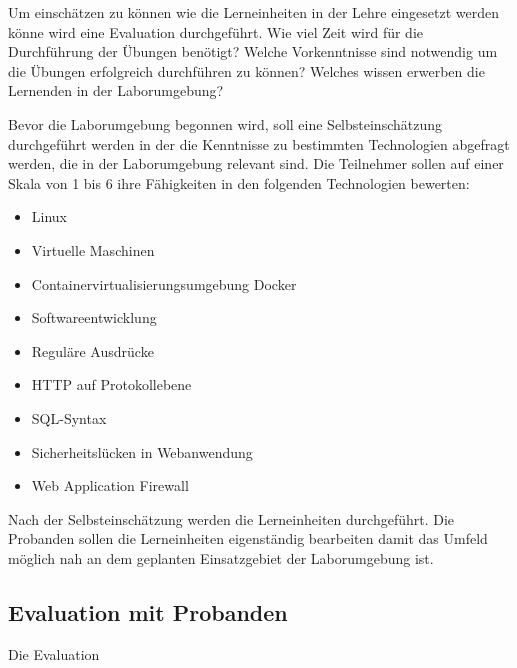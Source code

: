 Um einschätzen zu können wie die Lerneinheiten in der Lehre eingesetzt werden könne wird eine Evaluation durchgeführt.
Wie viel Zeit wird für die Durchführung der Übungen benötigt?
Welche Vorkenntnisse sind notwendig um die Übungen erfolgreich durchführen zu können?
Welches wissen erwerben die Lernenden in der Laborumgebung?

Bevor die Laborumgebung begonnen wird, soll eine Selbsteinschätzung durchgeführt werden in der die Kenntnisse zu bestimmten Technologien abgefragt werden, die in der Laborumgebung relevant sind.
Die Teilnehmer sollen auf einer Skala von 1 bis 6 ihre Fähigkeiten in den folgenden Technologien bewerten:

\begin{itemize}
    \item Linux
    \item Virtuelle Maschinen
    \item Containervirtualisierungsumgebung Docker
    \item Softwareentwicklung
    \item Reguläre Ausdrücke
    \item HTTP auf Protokollebene
    \item SQL-Syntax
    \item Sicherheitslücken in Webanwendung
    \item Web Application Firewall
\end{itemize}

Nach der Selbsteinschätzung werden die Lerneinheiten durchgeführt.
Die Probanden sollen die Lerneinheiten eigenständig bearbeiten damit das Umfeld möglich nah an dem geplanten Einsatzgebiet der Laborumgebung ist.



\subsection{Evaluation mit Probanden}

Die Evaluation 



